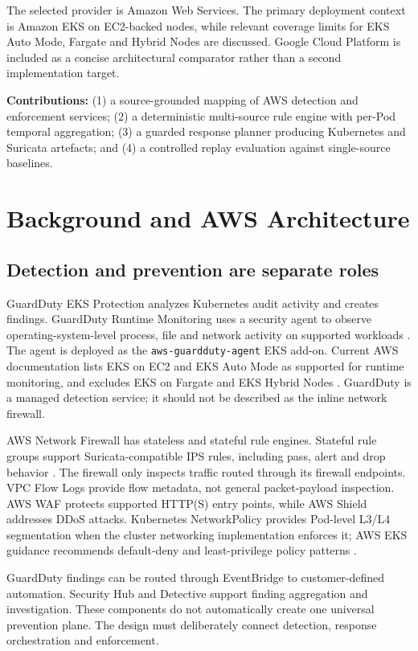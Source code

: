\documentclass[conference]{IEEEtran}
\begin{document}
The selected provider is Amazon Web Services. The primary deployment context is Amazon EKS on EC2-backed nodes, while relevant coverage limits for EKS Auto Mode, Fargate and Hybrid Nodes are discussed. Google Cloud Platform is included as a concise architectural comparator rather than a second implementation target.

\textbf{Contributions:} (1) a source-grounded mapping of AWS detection and enforcement services; (2) a deterministic multi-source rule engine with per-Pod temporal aggregation; (3) a guarded response planner producing Kubernetes and Suricata artefacts; and (4) a controlled replay evaluation against single-source baselines.

\section{Background and AWS Architecture}
\subsection{Detection and prevention are separate roles}
GuardDuty EKS Protection analyzes Kubernetes audit activity and creates findings. GuardDuty Runtime Monitoring uses a security agent to observe operating-system-level process, file and network activity on supported workloads \cite{gdEKS,gdRuntime}. The agent is deployed as the \texttt{aws-guardduty-agent} EKS add-on. Current AWS documentation lists EKS on EC2 and EKS Auto Mode as supported for runtime monitoring, and excludes EKS on Fargate and EKS Hybrid Nodes \cite{gdEKSRuntime}. GuardDuty is a managed detection service; it should not be described as the inline network firewall.

AWS Network Firewall has stateless and stateful rule engines. Stateful rule groups support Suricata-compatible IPS rules, including pass, alert and drop behavior \cite{nfwRules,nfwStateful}. The firewall only inspects traffic routed through its firewall endpoints. VPC Flow Logs provide flow metadata, not general packet-payload inspection. AWS WAF protects supported HTTP(S) entry points, while AWS Shield addresses DDoS attacks. Kubernetes NetworkPolicy provides Pod-level L3/L4 segmentation when the cluster networking implementation enforces it; AWS EKS guidance recommends default-deny and least-privilege policy patterns \cite{eksNetwork}.

GuardDuty findings can be routed through EventBridge to customer-defined automation. Security Hub and Detective support finding aggregation and investigation. These components do not automatically create one universal prevention plane. The design must deliberately connect detection, response orchestration and enforcement.
\end{document}
